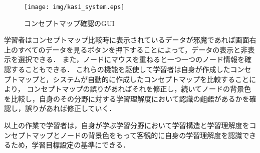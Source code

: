\begin{figure}[htbp]
\begin{center}
\texttt{[image: img/kasi\_system.eps]}
\end{center}
\caption{コンセプトマップ確認のGUI}
\label{fig:sinji_check}
\end{figure}
\newpage

学習者はコンセプトマップ比較時に表示されているデータが邪魔であれば画面右上のすべてのデータを見るボタンを押下することによって，データの表示と非表示を選択できる．
また，ノードにマウスを重ねると一つ一つのノード情報を確認することもできる．
これらの機能を駆使して学習者は自身が作成したコンセプトマップと，システムが自動的に作成したコンセプトマップを比較することにより，
コンセプトマップの誤りがあればそれを修正し，続いてノードの背景色を比較し，自身のその分野に対する学習理解度において認識の齟齬があるかを確認し，誤りがあれば修正していく．

以上の作業で学習者は，自身が学ぶ学習分野において学習構造と学習理解度をコンセプトマップとノードの背景色をもって客観的に自身の学習理解度を認識できるため，学習目標設定の基準にできる．
